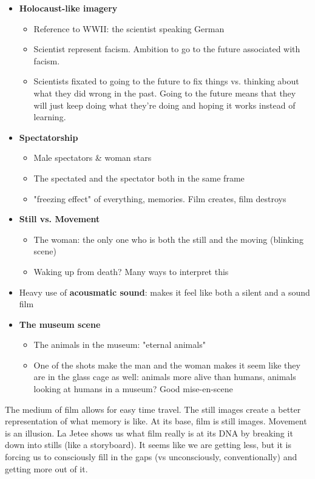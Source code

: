 \documentclass[11pt,fleqn]{book}
\begin{document}
\begin{itemize}
\begin{itemize}
    \end{itemize}
    \item \textbf{Holocaust-like imagery}
    \begin{itemize}
        \item Reference to WWII: the scientist speaking German
        \item Scientist represent facism. Ambition to go to the future associated with facism. 
        \item Scientists fixated to going to the future to fix things vs. thinking about what they did wrong in the past. Going to the future means that they will just keep doing what they're doing and hoping it works instead of learning.
    \end{itemize}
    \item \textbf{Spectatorship}
    \begin{itemize}
        \item Male spectators \& woman stars
        \item The spectated and the spectator both in the same frame
        \item "freezing effect" of everything, memories. Film creates, film destroys
    \end{itemize}
    \item \textbf{Still vs. Movement}
    \begin{itemize}
        \item The woman: the only one who is both the still and the moving (blinking scene)
        \item Waking up from death? Many ways to interpret this
    \end{itemize}
    \item Heavy use of \textbf{acousmatic sound}: makes it feel like both a silent and a sound film
    \item \textbf{The museum scene}
    \begin{itemize}
        \item The animals in the museum: "eternal animals"
        \item One of the shots make the man and the woman makes it seem like they are in the glass cage as well: animals more alive than humans, animals looking at humans in a museum? Good mise-en-scene
    \end{itemize}
\end{itemize}
\begin{remark}
    The medium of film allows for easy time travel. The still images create a better representation of what memory is like. At its base, film is still images. Movement is an illusion. La Jetee shows us what film really is at its DNA by breaking it down into stills (like a storyboard). It seems like we are getting less, but it is forcing us to consciously fill in the gaps (vs unconsciously, conventionally) and getting more out of it. 
\end{remark}
\end{document}
